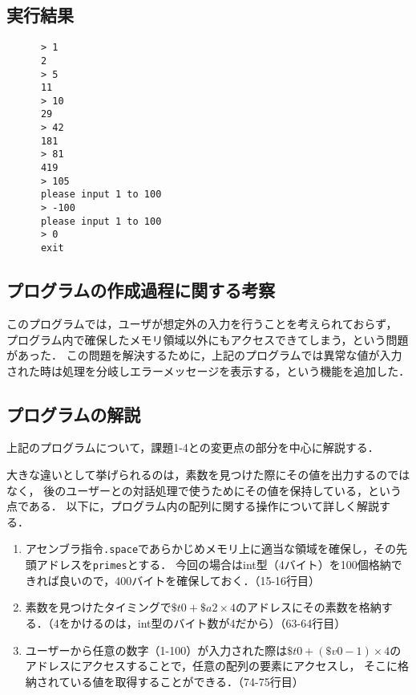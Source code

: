 \documentclass[a4j,11pt]{jarticle}
\begin{document}
\subsection{実行結果}

\begin{verbatim}
      > 1
      2
      > 5
      11
      > 10
      29
      > 42
      181
      > 81
      419
      > 105
      please input 1 to 100
      > -100
      please input 1 to 100
      > 0
      exit            
\end{verbatim}

\subsection{プログラムの作成過程に関する考察}

このプログラムでは，ユーザが想定外の入力を行うことを考えられておらず，
プログラム内で確保したメモリ領域以外にもアクセスできてしまう，という問題があった．
この問題を解決するために，上記のプログラムでは異常な値が入力された時は処理を分岐しエラーメッセージを表示する，という機能を追加した．

\subsection{プログラムの解説}
上記のプログラムについて，課題1-4との変更点の部分を中心に解説する．

大きな違いとして挙げられるのは，素数を見つけた際にその値を出力するのではなく，
後のユーザーとの対話処理で使うためにその値を保持している，という点である．
以下に，プログラム内の配列に関する操作について詳しく解説する．

\begin{enumerate}
      \item アセンブラ指令{\tt .space}であらかじめメモリ上に適当な領域を確保し，その先頭アドレスを{\tt primes}とする．
      今回の場合はint型（4バイト）を100個格納できれば良いので，400バイトを確保しておく．（15-16行目）
      \item 素数を見つけたタイミングで$\$t0 + \$a2 \times 4$のアドレスにその素数を格納する．（4をかけるのは，int型のバイト数が4だから）（63-64行目）
      \item ユーザーから任意の数字（1-100）が入力された際は$\$t0 + (\$v0 - 1) \times 4$のアドレスにアクセスすることで，任意の配列の要素にアクセスし，
      そこに格納されている値を取得することができる．（74-75行目）
\end{enumerate}


\end{document}
